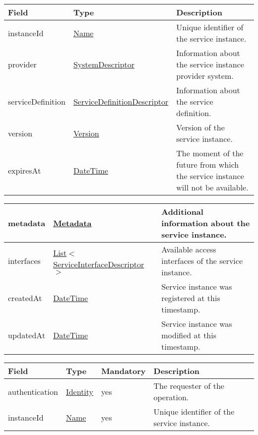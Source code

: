 \documentclass[a4paper]{arrowhead}
\newcommand{\pref}[1]{{\textcolor{ArrowheadGrey}{\hyperref[sec:model:primitives:#1]{#1}}}}
\begin{document}
\begin{table}[ht!]
\begin{tabularx}{\textwidth}{| p{2.6cm} | p{5.2cm} | X |} \hline
\rowcolor{gray!33} Field & Type      & Description \\ \hline
instanceId & \pref{Name} & Unique identifier of the service instance. \\ \hline
provider & \hyperref[sec:model:SystemDescriptor]{SystemDescriptor} & Information about the service instance provider system. \\ \hline
serviceDefinition & \hyperref[sec:model:ServiceDefinitionDescriptor]{ServiceDefinitionDescriptor} & Information about the service definition. \\ \hline
version & \pref{Version} & Version of the service instance. \\ \hline
expiresAt & \pref{DateTime} & The moment of the future from which the service ins\-tance will not be available. \\ \hline
\end{tabularx}
\end{table}

\begin{table}[ht!]
\begin{tabularx}{\textwidth}{| p{2.6cm} | p{5.2cm} | X |} \hline
metadata & \hyperref[sec:model:Metadata]{Metadata} & Additional information about the service ins\-tance. \\ \hline
interfaces & \pref{List}$<$\hyperref[sec:model:ServiceInterfaceDescriptor]{ServiceInterfaceDescriptor}$>$ & Available access interfaces of the service instance. \\ \hline
createdAt & \pref{DateTime} & Service instance was registered at this timestamp. \\ \hline
updatedAt & \pref{DateTime} & Service instance was modified at this timestamp. \\ \hline
\end{tabularx}
\end{table}

 
\begin{table}[H]
\begin{tabularx}{\textwidth}{| p{2.5cm} | p{2.5cm} | p{2cm} | X |} \hline
\rowcolor{gray!33} Field & Type & Mandatory & Description \\ \hline
authentication & \hyperref[sec:model:Identity]{Identity} & yes & The requester of the operation. \\ \hline
instanceId & \pref{Name} & yes & Unique identifier of the service instance. \\ \hline
\end{tabularx}
\end{table}
\end{document}
